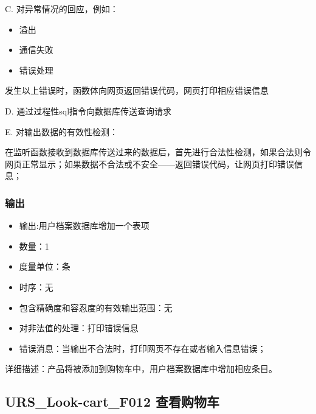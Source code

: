    
   C. 对异常情况的回应，例如：
   \begin{adjustwidth}{2cm}{1cm}\qquad
	   \begin{itemize}
		   \item 溢出
		   \item 通信失败
		   \item 错误处理
	   \end{itemize}		
   \end{adjustwidth}
   
	   发生以上错误时，函数体向网页返回错误代码，网页打印相应错误信息
   
D. 通过过程性sql指令向数据库传送查询请求
		   
   E. 对输出数据的有效性检测：
   
   在监听函数接收到数据库传送过来的数据后，首先进行合法性检测，如果合法则令网页正常显示；如果数据不合法或不安全——返回错误代码，让网页打印错误信息；
   
   \subsubsection{输出}
   \begin{itemize}
	   \item	输出:用户档案数据库增加一个表项
	   \item	数量：1
	   \item	度量单位：条
	   \item	时序：无
	   \item	包含精确度和容忍度的有效输出范围：无
	   \item	对非法值的处理：打印错误信息
	   \item	错误消息：当输出不合法时，打印网页不存在或者输入信息错误；
	  \end{itemize}
	  详细描述：产品将被添加到购物车中，用户档案数据库中增加相应条目。






	  \subsection{URS\_Look-cart\_F012 查看购物车}
